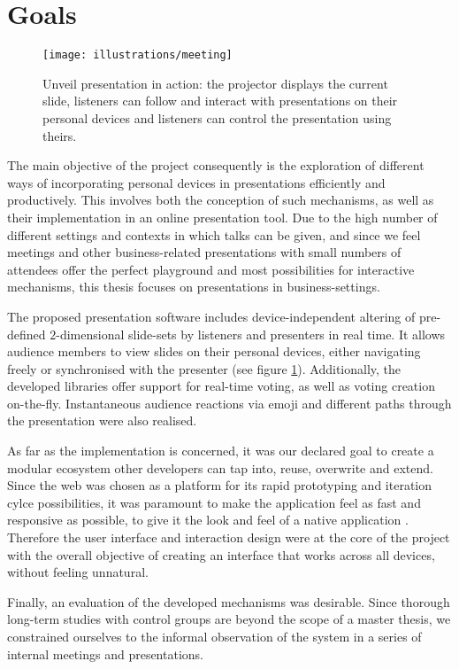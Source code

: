 \section{Goals}

\begin{figure}
\centering
\texttt{[image: illustrations/meeting]}
\caption{Unveil presentation in action: the projector displays the current slide, listeners can follow and interact with presentations on their personal devices and listeners can control the presentation using theirs.}
\label{fig:introduction-meeting}
\end{figure}

The main objective of the project consequently is the exploration of different ways of incorporating personal devices in presentations efficiently and productively. This involves both the conception of such mechanisms, as well as their implementation in an online presentation tool.
Due to the high number of different settings and contexts in which talks can be given, and since we feel meetings and other business-related presentations with small numbers of attendees offer the perfect playground and most possibilities for interactive mechanisms, this thesis focuses on presentations in business-settings.

The proposed presentation software includes device-independent altering of pre-defined $2$-dimensional slide-sets by listeners and presenters in real time. It allows audience members to view slides on their personal devices, either navigating freely or synchronised with the presenter (see figure \ref{fig:introduction-meeting}). Additionally, the developed libraries offer support for real-time voting, as well as voting creation on-the-fly. Instantaneous audience reactions via emoji and different paths through the presentation were also realised.

As far as the implementation is concerned, it was our declared goal to create a modular ecosystem other developers can tap into, reuse, overwrite and extend. Since the web was chosen as a platform for its rapid prototyping and iteration cylce possibilities, it was paramount to make the application feel as fast and responsive as possible, to give it the look and feel of a native application \cite{Charland:WebVsNative}. Therefore the user interface and interaction design were at the core of the project with the overall objective of creating an interface that works across all devices, without feeling unnatural.

Finally, an evaluation of the developed mechanisms was desirable. Since thorough long-term studies with control groups are beyond the scope of a master thesis, we constrained ourselves to the informal observation of the system in a series of internal meetings and presentations.

